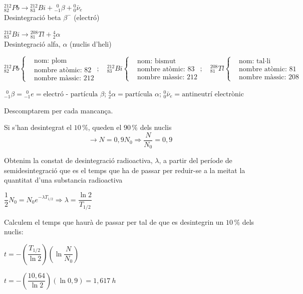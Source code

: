 \begin{solapartat}

 ${}^{212}_{82}Pb \rightarrow {}^{212}_{83}Bi + {}^{\;\,0}_{-1}\beta + {}^{0}_{0}\bar{\nu}_e$\\
Desintegració beta $\beta^-$ (electró)

 ${}^{212}_{83}Bi \rightarrow {}^{208}_{81}Tl + {}^{4}_{2}\alpha$\\
Desintegració alfa, $\alpha$ (nuclis d'heli)

\[ {}^{212}_{82}Pb\left\{\begin{aligned} &\text{nom: plom}\\ &\text{nombre atòmic: 82}\\ &\text{nombre màssic: 212}\end{aligned}\right. ;\quad
{}^{212}_{83}Bi\left\{\begin{aligned} &\text{nom: bismut}\\ &\text{nombre atòmic: 83}\\ &\text{nombre màssic: 212}\end{aligned}\right. ;\quad
{}^{208}_{81}Tl\left\{\begin{aligned} &\text{nom: tal·li}\\ &\text{nombre atòmic: 81}\\ &\text{nombre màssic: 208}\end{aligned}\right. \]

 ${}^{\;\,0}_{-1}\beta = {}^{\;\,0}_{-1}e = \text{electró - partícula } \beta$; ${}^{4}_{2}\alpha = \text{partícula } \alpha$; ${}^{0}_{0}\bar{\nu}_e = \text{antineutrí electrònic}$

Descomptarem  per cada mancança.
\end{solapartat}

\begin{solapartat}
 Si s'han desintegrat el $10\,\%$, queden el $90\,\%$ dels nuclis
\[ \rightarrow N = 0,9N_0 \Rightarrow \frac{N}{N_0} = 0,9 \]

Obtenim la constat de desintegració radioactiva, $\lambda$, a partir del període de semidesintegració que es el temps que ha de passar per reduir-se a la meitat la quantitat d'una substancia radioactiva

 $\dfrac{1}{2}N_0 = N_0e^{-\lambda T_{1/2}} \Rightarrow \lambda = \dfrac{\ln 2}{T_{1/2}}$

Calculem el temps que haurà de passar per tal de que es desintegrin un $10\,\%$ dels nuclis:

 $t = -\left(\dfrac{T_{1/2}}{\ln 2}\right)\left(\ln\dfrac{N}{N_0}\right)$

 $t = -\left(\dfrac{10,64}{\ln 2}\right)(\ln 0,9) = 1,617\ h$
\end{solapartat}
